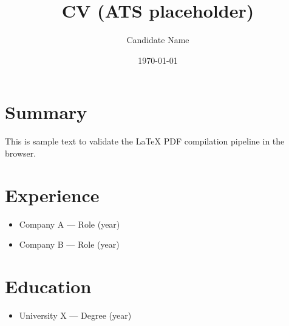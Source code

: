\documentclass[10pt,a4paper]{article}
\title{CV (ATS placeholder)}
\author{Candidate Name}
\date{\today}
\begin{document}
\maketitle

\section*{Summary}
This is sample text to validate the LaTeX \textrightarrow{} PDF
compilation pipeline in the browser.

\section*{Experience}
\begin{itemize}[nosep]
  \item Company A --- Role (year)
  \item Company B --- Role (year)
\end{itemize}

\section*{Education}
\begin{itemize}[nosep]
  \item University X --- Degree (year)
\end{itemize}
\end{document}
